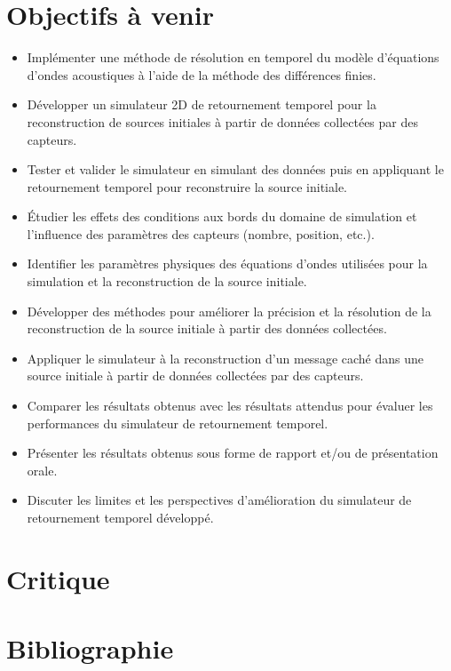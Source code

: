 \documentclass[11pt, a4paper]{article}
\begin{document}
\section{Objectifs à venir}
\begin{itemize}
    \item Implémenter une méthode de résolution en temporel du modèle d'équations d'ondes acoustiques à l'aide de la méthode des différences finies.
    \item Développer un simulateur 2D de retournement temporel pour la reconstruction de sources initiales à partir de données collectées par des capteurs.
    \item Tester et valider le simulateur en simulant des données puis en appliquant le retournement temporel pour reconstruire la source initiale.
    \item Étudier les effets des conditions aux bords du domaine de simulation et l'influence des paramètres des capteurs (nombre, position, etc.).
    \item Identifier les paramètres physiques des équations d'ondes utilisées pour la simulation et la reconstruction de la source initiale.
    \item Développer des méthodes pour améliorer la précision et la résolution de la reconstruction de la source initiale à partir des données collectées.
    \item Appliquer le simulateur à la reconstruction d'un message caché dans une source initiale à partir de données collectées par des capteurs.
    \item Comparer les résultats obtenus avec les résultats attendus pour évaluer les performances du simulateur de retournement temporel.
    \item Présenter les résultats obtenus sous forme de rapport et/ou de présentation orale.
    \item Discuter les limites et les perspectives d'amélioration du simulateur de retournement temporel développé.
\end{itemize}
\section{Critique}
\section{Bibliographie}
\end{document}
